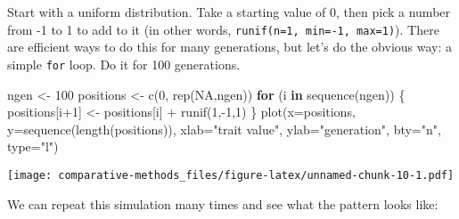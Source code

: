 \documentclass[
]{article}
\newenvironment{Shaded}{\begin{snugshade}}{\end{snugshade}}
\newcommand{\AttributeTok}[1]{\textcolor[rgb]{0.77,0.63,0.00}{#1}}
\newcommand{\ConstantTok}[1]{\textcolor[rgb]{0.00,0.00,0.00}{#1}}
\newcommand{\ControlFlowTok}[1]{\textcolor[rgb]{0.13,0.29,0.53}{\textbf{#1}}}
\newcommand{\DecValTok}[1]{\textcolor[rgb]{0.00,0.00,0.81}{#1}}
\newcommand{\FunctionTok}[1]{\textcolor[rgb]{0.00,0.00,0.00}{#1}}
\newcommand{\NormalTok}[1]{#1}
\newcommand{\OtherTok}[1]{\textcolor[rgb]{0.56,0.35,0.01}{#1}}
\newcommand{\SpecialCharTok}[1]{\textcolor[rgb]{0.00,0.00,0.00}{#1}}
\newcommand{\StringTok}[1]{\textcolor[rgb]{0.31,0.60,0.02}{#1}}
\begin{document}
Start with a uniform distribution. Take a starting value of 0, then pick a number from -1 to 1 to add to it (in other words, \texttt{runif(n=1,\ min=-1,\ max=1)}). There are efficient ways to do this for many generations, but let's do the obvious way: a simple \texttt{for} loop. Do it for 100 generations.

\begin{Shaded}
\begin{Highlighting}[]
\NormalTok{ngen }\OtherTok{\textless{}{-}} \DecValTok{100}
\NormalTok{positions }\OtherTok{\textless{}{-}} \FunctionTok{c}\NormalTok{(}\DecValTok{0}\NormalTok{, }\FunctionTok{rep}\NormalTok{(}\ConstantTok{NA}\NormalTok{,ngen))}
\ControlFlowTok{for}\NormalTok{ (i }\ControlFlowTok{in} \FunctionTok{sequence}\NormalTok{(ngen)) \{}
\NormalTok{  positions[i}\SpecialCharTok{+}\DecValTok{1}\NormalTok{] }\OtherTok{\textless{}{-}}\NormalTok{ positions[i] }\SpecialCharTok{+} \FunctionTok{runif}\NormalTok{(}\DecValTok{1}\NormalTok{,}\SpecialCharTok{{-}}\DecValTok{1}\NormalTok{,}\DecValTok{1}\NormalTok{)}
\NormalTok{\}}
\FunctionTok{plot}\NormalTok{(}\AttributeTok{x=}\NormalTok{positions, }\AttributeTok{y=}\FunctionTok{sequence}\NormalTok{(}\FunctionTok{length}\NormalTok{(positions)), }\AttributeTok{xlab=}\StringTok{"trait value"}\NormalTok{, }\AttributeTok{ylab=}\StringTok{"generation"}\NormalTok{, }\AttributeTok{bty=}\StringTok{"n"}\NormalTok{, }\AttributeTok{type=}\StringTok{"l"}\NormalTok{)}
\end{Highlighting}
\end{Shaded}

\texttt{[image: comparative-methods\_files/figure-latex/unnamed-chunk-10-1.pdf]}

We can repeat this simulation many times and see what the pattern looks like:
\end{document}
